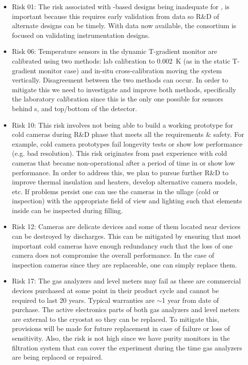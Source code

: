 \begin{itemize}
    \item Risk 01: The risk associated with -based designs being inadequate for , is important because this requires early validation from  data so R\&D of alternate designs can be timely. With  data now available, the consortium is focused on validating instrumentation designs. 
    \item Risk 06: Temperature sensors in the dynamic T-gradient monitor are calibrated using two methods: lab calibration to 0.002~K (as in the static T-gradient monitor case) and in-situ cross-calibration moving the system vertically. Disagreement between the two methods can occur. In order to mitigate this we need to investigate and improve both methods, specifically the laboratory calibration since this is the only one possible for sensors behind s, and top/bottom of the detector.  
    \item Risk 10: This risk involves not being able to build a working prototype for cold cameras during R\&D phase that meets all the requirements \& safety. For example, cold camera prototypes fail longevity tests or show low performance (e.g. bad resolution). This risk originates from past experience with cold cameras that became non-operational after a period of time in  or show low performance. In order to address this, we plan to pursue further R\&D to improve thermal insulation and heaters, develop alternative camera models, etc. If problems persist one can use the cameras in the ullage (cold or inspection) with the appropriate field of view and lighting such that elements inside  can be inspected during filling.
    \item Risk 12: Cameras are delicate devices and some of them located near  devices can be destroyed by  discharges. This can be mitigated by ensuring that most important cold cameras have enough redundancy such that the loss of one camera does not compromise the overall performance. In the case of inspection cameras since they are replaceable, one can simply replace them.
    \item Risk 17: The gas analyzers and level meters may fail as these are commercial devices purchased at some point in their product cycle and cannot be required to last 20 years. Typical warranties are $\sim$1 year from date of purchase. The active electronics parts of both gas analyzers and level meters are external to the cryostat so they can be replaced. To mitigate this, provisions will be made for future replacement in case of failure or loss of sensitivity. Also, the risk is not high since we have purity monitors in the filtration system that can cover the experiment during the time gas analyzers are being replaced or repaired. 
\end{itemize}

